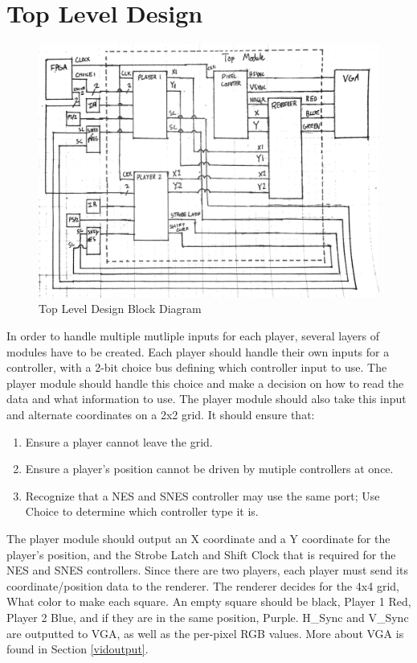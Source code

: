\documentclass[]{article}
\begin{document}
\section{Top Level Design}
\begin{figure}[H]\centering
    \includegraphics[width=\linewidth]{figures/Top_Block.jpg}
    \caption{Top Level Design Block Diagram} 
    \label{fig:TopLevelDesign}
\end{figure}

In order to handle multiple mutliple inputs for each player, several layers of modules have to be created.
Each player should handle their own inputs for a controller, with a 2-bit choice bus defining which controller input to use.
The player module should handle this choice and make a decision on how to read the data and what information to use.
The player module should also take this input and alternate coordinates on a 2x2 grid. It should ensure that:
\begin{enumerate}
    \item Ensure a player cannot leave the grid.
    \item Ensure a player's position cannot be driven by mutiple controllers at once.
    \item Recognize that a NES and SNES controller may use the same port; Use Choice to determine which controller type it is.
\end{enumerate}
The player module should output an X coordinate and a Y coordinate for the player's position,
and the Strobe Latch and Shift Clock that is required for the NES and SNES controllers.
Since there are two players, each player must send its coordinate/position data to the renderer.
The renderer decides for the 4x4 grid, What color to make each square. An empty square should
be black, Player 1 Red, Player 2 Blue, and if they are in the same position, Purple. 
H\_Sync and V\_Sync are outputted to VGA, as well as the per-pixel RGB values.
More about VGA is found in Section \ref{vidoutput}.
\end{document}
